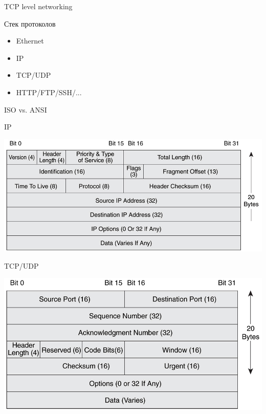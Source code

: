 \documentclass{article}
\begin{document}
\LARGE

\begin{center} TCP level networking \end{center}
\newpage

\begin{center} Стек протоколов \end{center}
\begin{itemize}
    \item Ethernet
    \item IP
    \item TCP/UDP
    \item HTTP/FTP/SSH/...
\end{itemize}
\newpage

\begin{center} ISO vs. ANSI \end{center}
\newpage

\begin{center} IP \end{center}
\includegraphics[scale=0.6]{images/ip_header.jpg}
\newpage

\begin{center} TCP/UDP \end{center}
\includegraphics[scale=0.6]{images/tcpheader.jpg}
\newpage
\end{document}
